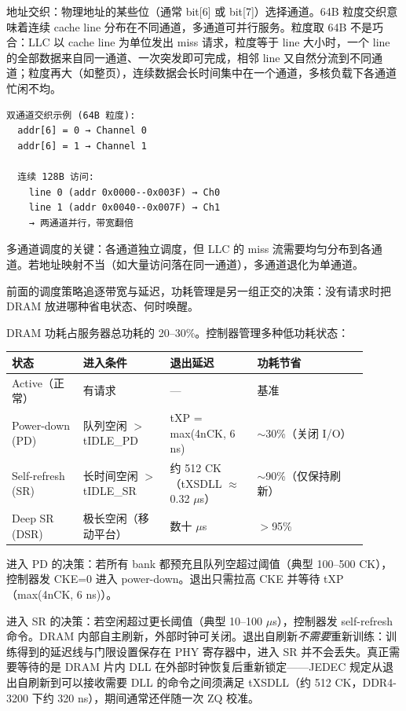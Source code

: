 地址交织：物理地址的某些位（通常 bit[6] 或 bit[7]）选择通道。64B 粒度交织意味着连续 cache line 分布在不同通道，多通道可并行服务。粒度取 64B 不是巧合：LLC 以 cache line 为单位发出 miss 请求，粒度等于 line 大小时，一个 line 的全部数据来自同一通道、一次突发即可完成，相邻 line 又自然分流到不同通道；粒度再大（如整页），连续数据会长时间集中在一个通道，多核负载下各通道忙闲不均。

\begin{lstlisting}
双通道交织示例 (64B 粒度):
  addr[6] = 0 → Channel 0
  addr[6] = 1 → Channel 1

  连续 128B 访问:
    line 0 (addr 0x0000--0x003F) → Ch0
    line 1 (addr 0x0040--0x007F) → Ch1
    → 两通道并行，带宽翻倍
\end{lstlisting}

多通道调度的关键：各通道独立调度，但 LLC 的 miss 流需要均匀分布到各通道。若地址映射不当（如大量访问落在同一通道），多通道退化为单通道。


前面的调度策略追逐带宽与延迟，功耗管理是另一组正交的决策：没有请求时把 DRAM 放进哪种省电状态、何时唤醒。

DRAM 功耗占服务器总功耗的 20--30\%。控制器管理多种低功耗状态：

\begin{longtable}{L{0.18\linewidth}L{0.22\linewidth}L{0.22\linewidth}L{0.28\linewidth}}
\toprule
状态 & 进入条件 & 退出延迟 & 功耗节省 \\
\midrule
Active（正常） & 有请求 & — & 基准 \\\tablerowrule
Power-down (PD) & 队列空闲 $>$ tIDLE\_PD & tXP = max(4nCK, 6 ns) & $\sim$30\%（关闭 I/O） \\\tablerowrule
Self-refresh (SR) & 长时间空闲 $>$ tIDLE\_SR & 约 512 CK（tXSDLL $\approx$ 0.32 $\mu$s） & $\sim$90\%（仅保持刷新） \\\tablerowrule
Deep SR (DSR) & 极长空闲（移动平台） & 数十 $\mu$s & $>$95\% \\
\bottomrule
\end{longtable}

进入 PD 的决策：若所有 bank 都预充且队列空超过阈值（典型 100--500 CK），控制器发 CKE=0 进入 power-down。退出只需拉高 CKE 并等待 tXP（max(4nCK, 6 ns)）。

进入 SR 的决策：若空闲超过更长阈值（典型 10--100 $\mu$s），控制器发 self-refresh 命令。DRAM 内部自主刷新，外部时钟可关闭。退出自刷新\emph{不需要}重新训练：训练得到的延迟线与门限设置保存在 PHY 寄存器中，进入 SR 并不会丢失。真正需要等待的是 DRAM 片内 DLL 在外部时钟恢复后重新锁定——JEDEC 规定从退出自刷新到可以接收需要 DLL 的命令之间须满足 tXSDLL（约 512 CK，DDR4-3200 下约 320 ns），期间通常还伴随一次 ZQ 校准。

